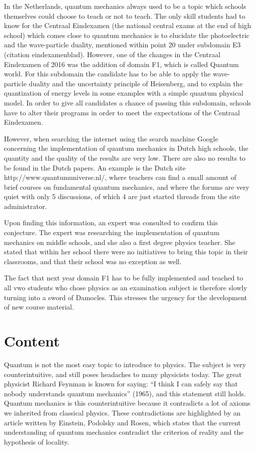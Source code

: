 \documentclass[12pt]{report} %
\begin{document}
In the Netherlands, quantum mechanics always used to be a topic which schools themselves could choose to teach or not to teach. The only skill students had to know for the Centraal Eindexamen (the national central exams at the end of high school) which comes close to quantum mechanics is to elucidate the photoelectric and the wave-particle duality, mentioned within point 20 under subdomain E3 (citation eindexamenblad). However, one of the changes in the Centraal Eindexamen of 2016 was the addition of domain F1, which is called Quantum world. For this subdomain the candidate has to be able to apply the wave-particle duality and the uncertainty principle of Heisenberg, and to explain the quantization of energy levels in some examples with a simple quantum physical model. In order to give all candidates a chance of passing this subdomain, schools have to alter their programs in order to meet the expectations of the Centraal Eindexamen.

However, when searching the internet using the search machine Google concerning the implementation of quantum mechanics in Dutch high schools, the quantity and the quality of the results are very low. There are also no results to be found in the Dutch papers. An example is the Dutch site http://www.quantumuniverse.nl/, where teachers can find a small amount of brief courses on fundamental quantum mechanics, and where the forums are very quiet with only 5 discussions, of which 4 are just started threads from the site administrator.

Upon finding this information, an expert was consulted to confirm this conjecture. The expert was researching the implementation of quantum mechanics on middle schools, and she also a first degree physics teacher. She stated that within her school there were no initiatives to bring this topic in their classrooms, and that their school was no exception as well.

The fact that next year domain F1 has to be fully implemented and teached to all vwo students who chose physics as an examination subject is therefore slowly turning into a sword of Damocles. This stresses the urgency for the development of new course material.

\section{Content}

Quantum is not the most easy topic to introduce to physics. The subject is very counterintuitive, and still poses headaches to many physicists today. The great physicist Richard Feynman is known for saying: “I think I can safely say that nobody understands quantum mechanics” (1965), and this statement still holds. Quantum mechanics is this counterintuitive because it contradicts a lot of axioms we inherited from classical physics. These contradictions are highlighted by an article written by Einstein, Podolsky and Rosen, which states that the current understanding of quantum mechanics contradict the criterion of reality and the hypothesis of locality.
\end{document}
